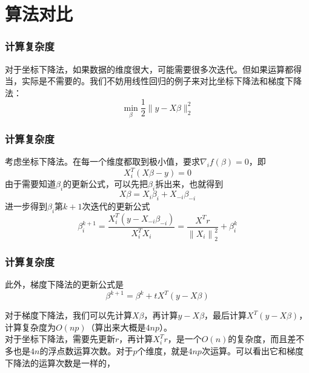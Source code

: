 \documentclass[10pt]{beamer}
\begin{document}
\section{算法对比}

\begin{frame}
\frametitle{计算复杂度}
对于坐标下降法，如果数据的维度很大，可能需要很多次迭代。但如果运算都得当，实际是不需要的。我们不妨用线性回归的例子来对比坐标下降法和梯度下降法：
$$
\min _{\beta} \frac{1}{2}\|y-X \beta\|_{2}^{2}
$$
\end{frame}
\begin{frame}
	\frametitle{计算复杂度}

考虑坐标下降法。在每一个维度都取到极小值，要求$\nabla_{i} f(\beta)=0$，即
$$X_{i}^{T}(X\beta-y)=0$$
由于需要知道$\beta_{i}$的更新公式，可以先把$\beta_{i}$拆出来，也就得到
$$X\beta=X_{i}\beta_{i}+X_{-i} \beta_{-i}$$ 进一步得到$\beta_{i}$第$k+1$次迭代的更新公式
$$\beta_{i}^{k+1}=\frac{X_{i}^{T}\left(y-X_{-i} \beta_{-i}\right)}{X_{i}^{T} X_{i}}=\frac{X^{T} r}{\left\|X_{i}\right\|_{2}^{2}}+\beta_{i}^{k}$$
\end{frame}
\begin{frame}
	\frametitle{计算复杂度}

此外，梯度下降法的更新公式是
$$
\beta^{k+1}=\beta^{k}+t X^{T}(y-X \beta)
$$

对于梯度下降法，我们可以先计算$X \beta$，再计算$y-X \beta$，最后计算$X^{T}(y-X \beta)$，计算复杂度为$O(np)$（算出来大概是$4np$）。\\
\bigskip
对于坐标下降法，需要先更新$r$，再计算$X_{i}^{T} r$，是一个$O(n)$的复杂度，而且差不多也是$4n$的浮点数运算次数。对于$p$个维度，就是$4np$次运算。可以看出它和梯度下降法的运算次数是一样的，
\end{frame}

\end{document}
